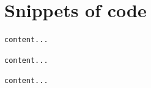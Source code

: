 \documentclass[12pt]{article}%
\theoremstyle{definition}
\begin{document}
	\section{Snippets of code}
	
	
		\begin{lstlisting}[language=Python]
		content...
		\end{lstlisting}
		
		
		
		\begin{lstlisting}[language=Python]
		content...
		\end{lstlisting}
			
			
			
		\begin{lstlisting}[language=Python]
		content...
		\end{lstlisting}
	
	
	
%	
%	
	
	
\end{document}
